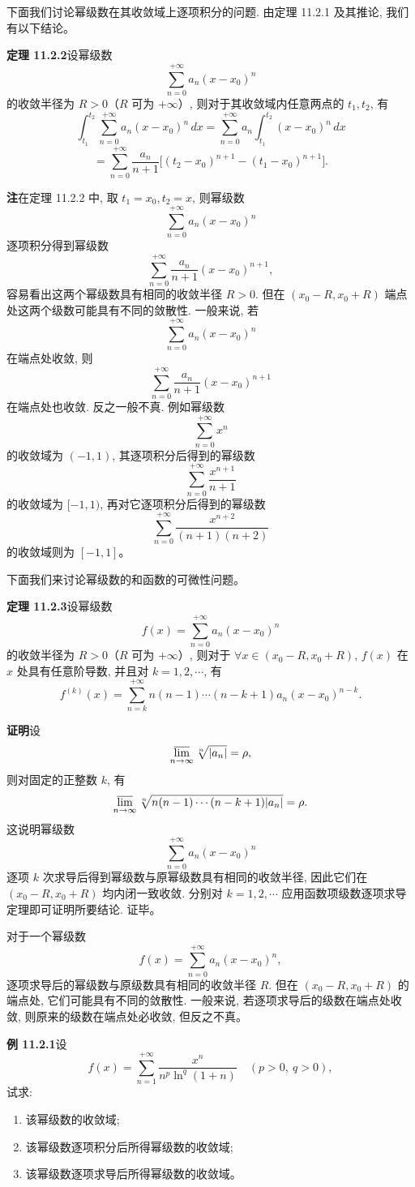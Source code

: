 \documentclass[UTF8, 12pt, fontset=fandol, oneside]{ctexart}
\begin{document}
下面我们讨论幂级数在其收敛域上逐项积分的问题. 由定理 11.2.1 及其推论, 我们有以下结论。

\noindent\textbf{定理 11.2.2}\quad 设幂级数
\[
  \sum_{n=0}^{+\infty}a_n(x-x_0)^n
\]
的收敛半径为 $R>0$（$R$ 可为 $+\infty$）, 则对于其收敛域内任意两点的 $t_1,t_2$, 有
\[
  \int_{t_1}^{t_2}\sum_{n=0}^{+\infty}a_n(x-x_0)^n\,dx
  =
  \sum_{n=0}^{+\infty}a_n\int_{t_1}^{t_2}(x-x_0)^n\,dx
\]
\[
  =
  \sum_{n=0}^{+\infty}\frac{a_n}{n+1}
  \bigl[(t_2-x_0)^{n+1}-(t_1-x_0)^{n+1}\bigr].
\]

\noindent\textbf{注}\quad 在定理 11.2.2 中, 取 $t_1=x_0,t_2=x$, 则幂级数
\[
  \sum_{n=0}^{+\infty}a_n(x-x_0)^n
\]
逐项积分得到幂级数
\[
  \sum_{n=0}^{+\infty}\frac{a_n}{n+1}(x-x_0)^{n+1},
\]
容易看出这两个幂级数具有相同的收敛半径 $R>0$. 但在 $(x_0-R,x_0+R)$ 端点处这两个级数可能具有不同的敛散性. 一般来说, 若
\[
  \sum_{n=0}^{+\infty}a_n(x-x_0)^n
\]
在端点处收敛, 则
\[
  \sum_{n=0}^{+\infty}\frac{a_n}{n+1}(x-x_0)^{n+1}
\]
在端点处也收敛. 反之一般不真. 例如幂级数
\[
  \sum_{n=0}^{+\infty}x^n
\]
的收敛域为 $(-1,1)$, 其逐项积分后得到的幂级数
\[
  \sum_{n=0}^{+\infty}\frac{x^{n+1}}{n+1}
\]
的收敛域为 $[-1,1)$, 再对它逐项积分后得到的幂级数
\[
  \sum_{n=0}^{+\infty}\frac{x^{n+2}}{(n+1)(n+2)}
\]
的收敛域则为 $[-1,1]$。

下面我们来讨论幂级数的和函数的可微性问题。

\noindent\textbf{定理 11.2.3}\quad 设幂级数
\[
  f(x)=\sum_{n=0}^{+\infty}a_n(x-x_0)^n
\]
的收敛半径为 $R>0$（$R$ 可为 $+\infty$）, 则对于 $\forall x\in(x_0-R,x_0+R)$, $f(x)$ 在 $x$ 处具有任意阶导数, 并且对 $k=1,2,\cdots$, 有
\[
  f^{(k)}(x)
  =
  \sum_{n=k}^{+\infty}n(n-1)\cdots(n-k+1)a_n(x-x_0)^{n-k}.
\]

\noindent\textbf{证明}\quad 设
\[
  \varlimsup_{n\to\infty}\sqrt[n]{|a_n|}=\rho,
\]
则对固定的正整数 $k$, 有
\[
  \varlimsup_{n\to\infty}
  \sqrt[n]{n(n-1)\cdots(n-k+1)|a_n|}
  =\rho.
\]
这说明幂级数
\[
  \sum_{n=0}^{+\infty}a_n(x-x_0)^n
\]
逐项 $k$ 次求导后得到幂级数与原幂级数具有相同的收敛半径, 因此它们在 $(x_0-R,x_0+R)$ 均内闭一致收敛. 分别对 $k=1,2,\cdots$ 应用函数项级数逐项求导定理即可证明所要结论. 证毕。

对于一个幂级数
\[
  f(x)=\sum_{n=0}^{+\infty}a_n(x-x_0)^n,
\]
逐项求导后的幂级数与原级数具有相同的收敛半径 $R$. 但在 $(x_0-R,x_0+R)$ 的端点处, 它们可能具有不同的敛散性. 一般来说, 若逐项求导后的级数在端点处收敛, 则原来的级数在端点处必收敛, 但反之不真。

\noindent\textbf{例 11.2.1}\quad 设
\[
  f(x)=\sum_{n=1}^{+\infty}\frac{x^n}{n^p\ln^q(1+n)}
  \quad(p>0,\ q>0),
\]
试求:
\begin{enumerate}
  \item 该幂级数的收敛域;
  \item 该幂级数逐项积分后所得幂级数的收敛域;
  \item 该幂级数逐项求导后所得幂级数的收敛域。
\end{enumerate}
\end{document}
